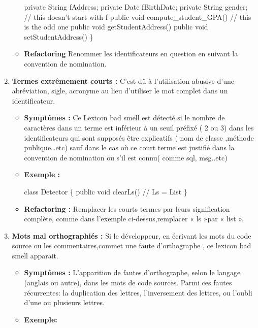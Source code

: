 \begin{enumerate}
\begin{itemize}
\begin{framed}
{   private String fAddress;\newline
   private Date fBirthDate;\newline
   private String gender;  // this doesn't start with f\newline
   public void compute\_student\_GPA()  // this is the odd one\newline
   public void getStudentAddress()\newline
   public void setStudentAddress()\newline
\}
}
\end{framed}
\item \textbf {Refactoring}
Renommer les identificateurs en question en suivant la convention de nomination.
\end{itemize}
\item \textbf {Termes extrêmement courts :}
C’est dû à l’utilisation abusive d’une abréviation, sigle, acronyme au lieu d’utiliser le mot complet dans un identificateur.
\begin{itemize}

\item \textbf {Symptômes :}
Ce Lexicon bad smell est détecté si le nombre de caractères dans un terme est inférieur à un seuil préfixé ( 2 ou 3) dans les identificateurs qui sont supposés être explicatifs ( nom de  classe ,méthode publique…etc) sauf dans le cas où ce court terme est justifié dans la convention de nomination ou s'il est connu( comme sql, msg..etc)

\item \textbf {Exemple :}
\begin{framed}
    {\selectfont

class Detector \{\newline
   public void clearLs() {} // Ls = List\newline
 \}
 }
 \end{framed}
\item \textbf {Refactoring :}
Remplacer les courts termes par leurs signification complète, comme dans l’exemple ci-dessus,remplacer « ls »par « list ».
\end{itemize}
\item \textbf {Mots mal orthographiés :}
Si le développeur, en écrivant les mots du code source ou les commentaires,commet une faute d’orthographe , ce lexicon bad smell apparait.
\begin{itemize}
\item \textbf {Symptômes :}
L’apparition de fautes d’orthographe, selon le langage (anglais ou autre), dans les mots de code sources. Parmi ces fautes récurrentes: la duplication des lettres, l’inversement des lettres, ou l’oubli d’une ou plusieurs lettres.
\item \textbf {Exemple:}
\begin{framed}
   {\selectfont 

}
\end{framed}
\end{itemize}
\end{enumerate}
